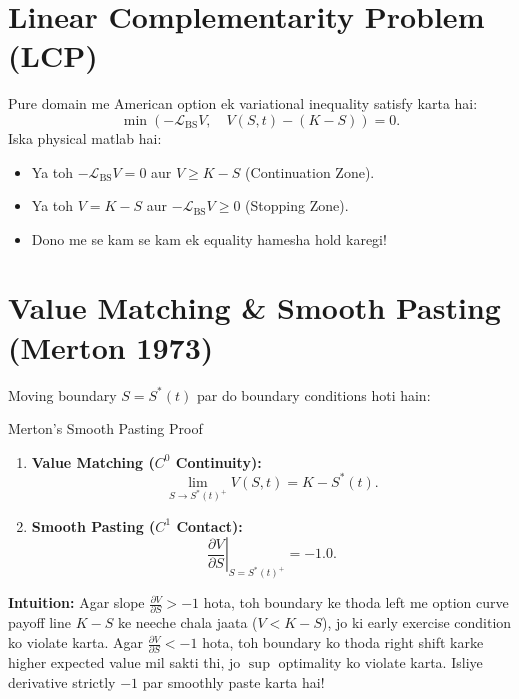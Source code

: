 \documentclass[11pt,a4paper,oneside]{book}
\begin{document}
\section{Linear Complementarity Problem (LCP)}
Pure domain me American option ek variational inequality satisfy karta hai:
\begin{equation}
    \boxed{\min \left( -\mathcal{L}_{\text{BS}} V, \quad V(S, t) - (K - S) \right) = 0.}
\end{equation}
Iska physical matlab hai:
\begin{itemize}
    \item Ya toh $-\mathcal{L}_{\text{BS}} V = 0$ aur $V \ge K - S$ (Continuation Zone).
    \item Ya toh $V = K - S$ aur $-\mathcal{L}_{\text{BS}} V \ge 0$ (Stopping Zone).
    \item Dono me se kam se kam ek equality hamesha hold karegi!
\end{itemize}

\section{Value Matching \& Smooth Pasting (Merton 1973)}
Moving boundary $S = S^*(t)$ par do boundary conditions hoti hain:

\begin{mathbox}{Merton's Smooth Pasting Proof}
\begin{enumerate}
    \item \textbf{Value Matching ($C^0$ Continuity):}
    \begin{equation}
        \lim_{S \to S^*(t)^+} V(S, t) = K - S^*(t).
    \end{equation}
    \item \textbf{Smooth Pasting ($C^1$ Contact):}
    \begin{equation}
        \left. \frac{\partial V}{\partial S} \right|_{S = S^*(t)^+} = -1.0.
    \end{equation}
\end{enumerate}

\textbf{Intuition:} Agar slope $\frac{\partial V}{\partial S} > -1$ hota, toh boundary ke thoda left me option curve payoff line $K-S$ ke neeche chala jaata ($V < K-S$), jo ki early exercise condition ko violate karta. 
Agar $\frac{\partial V}{\partial S} < -1$ hota, toh boundary ko thoda right shift karke higher expected value mil sakti thi, jo $\sup$ optimality ko violate karta. Isliye derivative strictly $-1$ par smoothly paste karta hai!
\end{mathbox}
\end{document}
